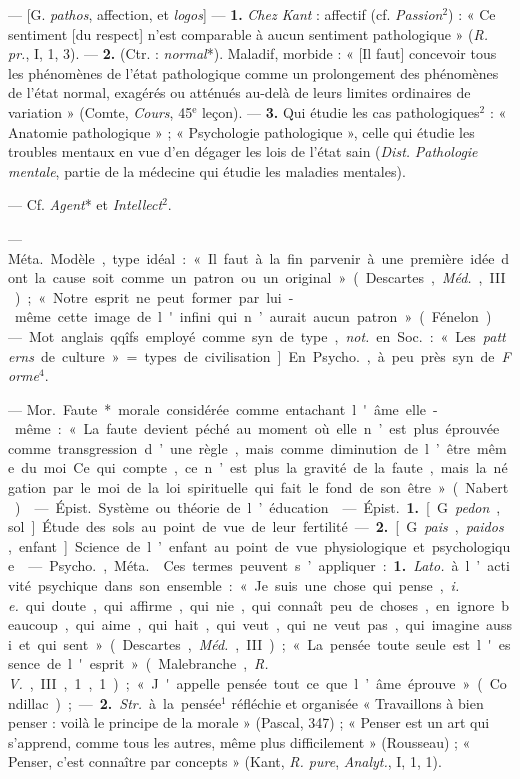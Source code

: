 \begin{itemize}[leftmargin=1cm, label=, itemsep=1pt]
 — [G. {\it pathos}, affection, et {\it logos}] — {\bf 1.}
{\it Chez Kant} : affectif (cf. {\it Passion}$^2$) : « Ce sentiment [du
respect] n’est comparable à aucun sentiment pathologique » ({\it R. pr.}, I,
1, 3). — {\bf 2.} (Ctr. : {\it normal}*). Maladif, morbide : « [Il faut]
concevoir tous les phénomènes de l’état pathologique comme un prolongement
des phénomènes de l'état normal, exagérés ou atténués au-delà de leurs
limites ordinaires de variation » (Comte, {\it Cours}, 45$^\text{e}$ leçon).
— {\bf 3.} Qui étudie les cas pathologiques$^2$ : « Anatomie pathologique » ;
« Psychologie pathologique », celle qui étudie les troubles mentaux en vue
d'en dégager les lois de l'état sain ({\it Dist.} {\it Pathologie mentale},
partie de la médecine qui étudie les maladies mentales).

 — Cf. {\it Agent}* et {\it Intellect}$^2$.

 — \si{Méta.} Modèle, type idéal : « Il faut à la fin parvenir à
une première idée dont la cause soit comme un patron ou un original...
» (Descartes, {\it Méd.}, III) ; « Notre esprit ne peut former par lui-même
cette image de l'infini qui n’aurait aucun patron » (Fénelon).

 — Mot anglais qqîfs employé comme syn. de type, {\it not.} en
\si{Soc.} : « Les {\it patterns} de culture » = types de civilisation]. En
\si{Psycho.}, à peu près syn. de {\it Forme}$^4$.

 — \si{Mor.} Faute* morale considérée comme entachant l'âme
elle-même : « La faute devient péché au moment où elle n’est plus éprouvée
comme transgression d’une règle, mais comme diminution de l’être même du moi.
Ce qui compte, ce n’est plus la gravité de la faute, mais la négation par le
moi de la loi spirituelle qui fait le fond de son être » (Nabert).

 — \si{Épist.} Système ou théorie de l’éducation.

 — \si{Épist.} {\bf 1.} [G. {\it pedon}, sol]. Étude des sols
au point de vue de leur fertilité. — {\bf 2.} [G. {\it pais}, {\it paidos},
enfant]. Science de l’enfant au point de vue physiologique et psychologique.

 — \si{Psycho.}, \si{Méta.}  Ces termes
peuvent s’appliquer : {\bf 1.} {\it Lato.} à l’activité psychique dans son
ensemble : « Je suis une chose qui pense, {\it i. e.} qui doute, qui affirme,
qui nie, qui connaît peu de choses, en ignore beaucoup, qui aime, qui hait,
qui veut, qui ne veut pas, qui imagine aussi et qui sent » (Descartes,
{\it Méd.}, III) ; « La pensée toute seule est l'essence de l'esprit
» (Malebranche, {\it R. V.}, III, 1, 1) ; « J'appelle pensée tout ce que
l’âme éprouve » (Condillac) ; — {\bf 2.} {\it Str.} à la pensée$^1$ réfléchie
et organisée « Travaillons à bien penser : voilà le principe de la morale
» (Pascal, 347) ; « Penser est un art qui s’apprend, comme tous les autres,
même plus difficilement » (Rousseau) ; « Penser, c’est connaître par
concepts » (Kant, {\it R. pure}, {\it Analyt.}, I, 1, 1).


\end{itemize}
